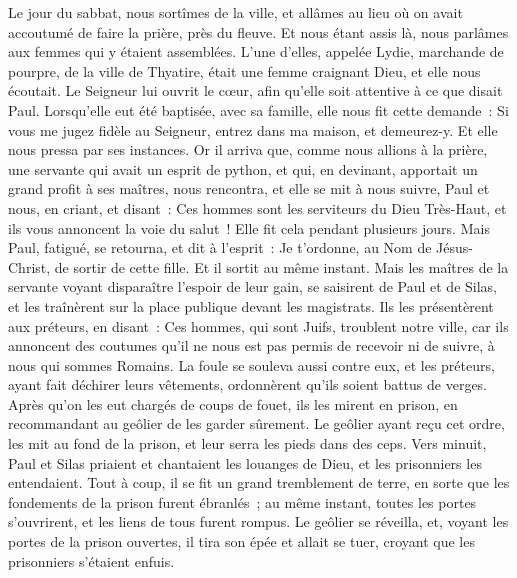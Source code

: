 \begin{multicols}{2}
Le jour du sabbat, nous sortîmes de la ville, et allâmes au lieu où on avait accoutumé de faire la prière, près du fleuve. Et nous étant assis là, nous parlâmes aux femmes qui y étaient assemblées.
L'une d'elles, appelée Lydie, marchande de pourpre, de la ville de Thyatire, était une femme craignant Dieu, et elle nous écoutait. Le Seigneur lui ouvrit le cœur, afin qu'elle soit attentive à ce que disait Paul.
Lorsqu'elle eut été baptisée, avec sa famille, elle nous fit cette demande~: Si vous me jugez fidèle au Seigneur, entrez dans ma maison, et demeurez-y. Et elle nous pressa par ses instances.
Or il arriva que, comme nous allions à la prière, une servante qui avait un esprit de python, et qui, en devinant, apportait un grand profit à ses maîtres, nous rencontra,
et elle se mit à nous suivre, Paul et nous, en criant, et disant~: Ces hommes sont les serviteurs du Dieu Très-Haut, et ils vous annoncent la voie du salut~!
Elle fit cela pendant plusieurs jours. Mais Paul, fatigué, se retourna, et dit à l'esprit~: Je t'ordonne, au Nom de Jésus-Christ, de sortir de cette fille. Et il sortit au même instant.
Mais les maîtres de la servante voyant disparaître l'espoir de leur gain, se saisirent de Paul et de Silas, et les traînèrent sur la place publique devant les magistrats.
Ils les présentèrent aux préteurs, en disant~: Ces hommes, qui sont Juifs, troublent notre ville,
car ils annoncent des coutumes qu'il ne nous est pas permis de recevoir ni de suivre, à nous qui sommes Romains.
La foule se souleva aussi contre eux, et les préteurs, ayant fait déchirer leurs vêtements, ordonnèrent qu'ils soient battus de verges.
Après qu'on les eut chargés de coups de fouet, ils les mirent en prison, en recommandant au geôlier de les garder sûrement.
Le geôlier ayant reçu cet ordre, les mit au fond de la prison, et leur serra les pieds dans des ceps.
Vers minuit, Paul et Silas priaient et chantaient les louanges de Dieu, et les prisonniers les entendaient.
Tout à coup, il se fit un grand tremblement de terre, en sorte que les fondements de la prison furent ébranlés~; au même instant, toutes les portes s'ouvrirent, et les liens de tous furent rompus.
Le geôlier se réveilla, et, voyant les portes de la prison ouvertes, il tira son épée et allait se tuer, croyant que les prisonniers s'étaient enfuis.

\end{multicols}
